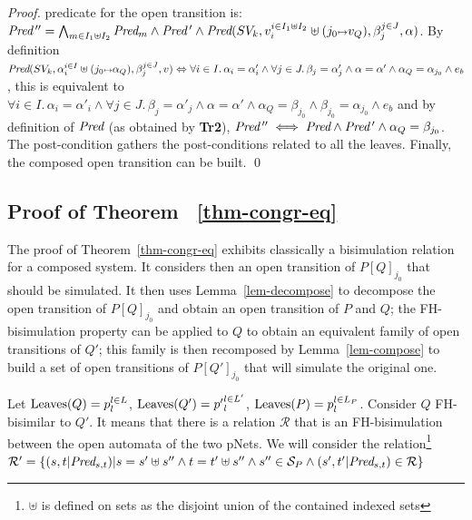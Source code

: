 \documentclass{lncs/llncs}
\begin{document}
\begin{small}
\begin{proof}
predicate for the open 
transition is: $\Pred\,''=\bigwedge_{m\in I _1\uplus I_2}\Pred_m \land \Pred\,'
\land \Pred(SV_k,v_i^{i\in I_1\uplus I_2}\uplus(j_0\mapsto v_Q),\beta_j^{j\in 
J},\alpha)$. 
By definition 
$\Pred(SV_k,\alpha_i^{i\in I}\uplus(j_0\mapsto \alpha_Q),\beta_j^{j\in 
J},v)\Leftrightarrow
	\forall i\in I.\, \alpha_i=\alpha'_i\land \forall j \in J.\, \beta_j=\alpha'_j \land 
	\alpha=\alpha'\land \alpha_Q=\alpha_{j_0}\land e_b$,
this is equivalent to $\forall i\in I.\, \alpha_i=\alpha'_i\land \forall j \in J.\, 
\beta_j=\alpha'_j \land 
	\alpha=\alpha'\land \alpha_Q=\beta_{j_0}\land \beta_{j_0}=\alpha_{j_0}\land e_b$
 and by definition of $\Pred$ (as obtained by \textbf{Tr2}),
	$\Pred\,''\iff \Pred\land\Pred\,'\land \alpha_Q=\beta_{j_0}$. The post-condition 
	gathers the post-conditions related to all 
	the leaves. Finally, the composed open transition can be
        built. \qed
        \end{proof}
\end{small}


 \subsection{Proof of Theorem ~\ref{thm-congr-eq}}
 The proof of Theorem~\ref{thm-congr-eq} exhibits classically a bisimulation relation for 
 a 
 composed system.  It considers then an open transition of $P[Q]_{j_0}$ that should be 
 simulated. It then uses  Lemma~\ref{lem-decompose} to decompose the open transition 
 of $P[Q]_{j_0}$ and obtain an open transition of $P$ and $Q$; the FH-bisimulation 
 property can 
 be applied  to $Q$ to obtain an equivalent family of open transitions of $Q'$; this 
 family is 
 then recomposed by Lemma~\ref{lem-compose} to build a set of open transitions of 
 $P[Q']_{j_0}$ 
 that will simulate the original one.
 

 Let $\operatorname{Leaves}(Q)=p_l^{l\in L}$, $\operatorname{Leaves}(Q')={p'}_l^{l\in L'}$, 
 $\operatorname{Leaves}(P)=p_l^{l\in L_P}$.
 Consider $Q$ FH-bisimilar to $Q'$. It means that there is a relation 
 $\mathcal{R}$ that is an FH-bisimulation between the open automata of the two pNets. 
 We will consider the relation\footnote{$\uplus$ is defined on sets as the disjoint union 
 of the contained indexed 
 sets} $\mathcal{R}'=\{(s,t|\Pred_{s,t})|s=s'\uplus s'' \land 
 t=t'\uplus s'' \land s''\in \mathcal{S}_P \land (s',t'|\Pred_{s,t})\in\mathcal{R}\}$ 
  
\end{document}
